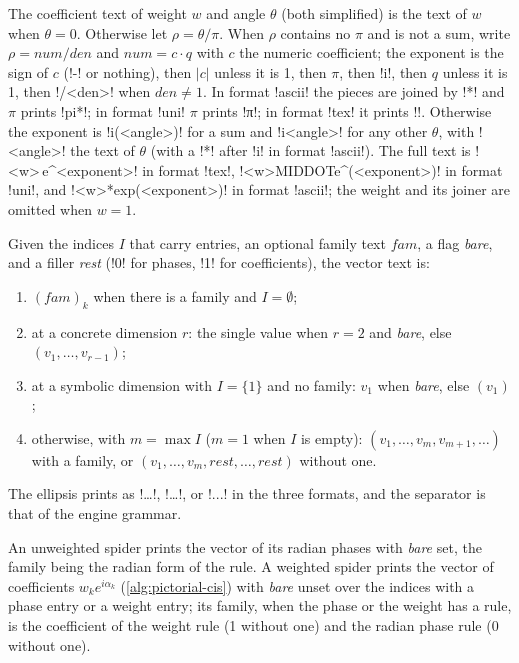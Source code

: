 {\begin{algorithm}[Coefficient]\label{alg:pictorial-cis}
The coefficient text of weight $w$ and angle $\theta$ (both simplified) is the text of $w$ when
$\theta=0$. Otherwise let $\rho = \theta/\pi$. When $\rho$ contains no $\pi$ and is not a sum,
write $\rho = \mathit{num}/\mathit{den}$ and $\mathit{num} = c\cdot q$ with $c$ the numeric
coefficient; the exponent is the sign of $c$ (\code!-! or nothing), then $|c|$ unless it is 1,
then $\pi$, then \code!i!, then $q$ unless it is 1, then \code!/<den>! when
$\mathit{den}\neq1$. In format \code!ascii! the pieces are joined by \code!*! and $\pi$ prints
\code!pi*!; in format \code!uni! $\pi$ prints \pgi!π!; in format \code!tex! it prints
\code!\pi!. Otherwise the exponent is \code!i(<angle>)! for a sum and \code!i<angle>! for any
other $\theta$, with \code!<angle>! the text of $\theta$ (with a \code!*! after \code!i! in format \code!ascii!). The full text is
\code!<w>\,e^{<exponent>}! in format \code!tex!, \code!<w>MIDDOTe^(<exponent>)! in format
\code!uni!, and \code!<w>*exp(<exponent>)! in format \code!ascii!; the weight and its joiner are
omitted when $w=1$.
\end{algorithm}

\begin{algorithm}\label{alg:pictorial-vector}
Given the indices $I$ that carry entries, an optional family text $\mathit{fam}$, a flag
\emph{bare}, and a filler \emph{rest} (\code!0! for phases, \code!1! for coefficients), the
vector text is:
\begin{enumerate}
  \item $(\mathit{fam})_k$ when there is a family and $I=\emptyset$;
  \item at a concrete dimension $r$: the single value when $r=2$ and \emph{bare}, else
    $(v_1, \dots, v_{r-1})$;
  \item at a symbolic dimension with $I=\{1\}$ and no family: $v_1$ when \emph{bare}, else
    $(v_1)$;
  \item otherwise, with $m=\max I$ ($m=1$ when $I$ is empty): $(v_1,\dots,v_m, v_{m+1}, \dots)$
    with a family, or $(v_1,\dots,v_m, \mathit{rest}, \dots, \mathit{rest})$ without one.
\end{enumerate}
The ellipsis prints as \code!\dots!, \pgi!…!, or \code!...! in the three formats, and the
separator is that of the engine grammar.
\end{algorithm}

An unweighted spider prints the vector of its radian phases with \emph{bare} set, the family
being the radian form of the rule. A weighted spider prints the vector of coefficients
$w_k e^{i\alpha_k}$ (\cref{alg:pictorial-cis}) with \emph{bare} unset over the indices with a
phase entry or a weight entry; its family, when the phase or the weight has a rule, is the
coefficient of the weight rule (1 without one) and the radian phase rule (0 without one).

}
